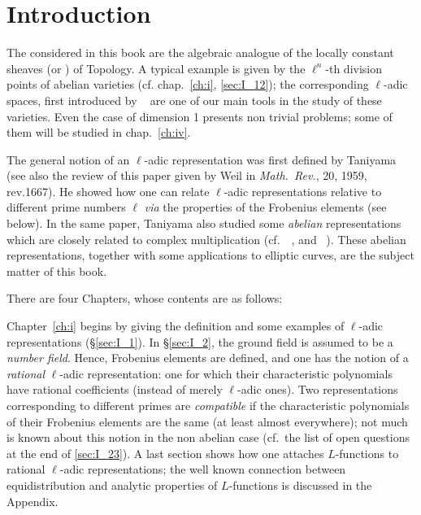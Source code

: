 \chapter*{Introduction}
The  considered in this book are the
algebraic analogue of the locally constant sheaves (or ) of Topology. A typical example is given by the $\ell^n$-th
division points of abelian varieties (cf. chap.~\ref{ch:i}, \ref{sec:I_12});
the corresponding $\ell$-adic spaces, first introduced by
\citeauthor{40}~\cite{40} are one of our main tools in the study of these
varieties. Even the case of dimension 1 presents non trivial problems; some of
them will be studied in chap.~\ref{ch:iv}.

The general notion of an $\ell$-adic representation was first defined by
Taniyama \cite{35} (see also the review of this paper given by Weil in
\emph{Math.\ Rev.}, 20, 1959, rev.1667).  He showed how one can relate
$\ell$-adic representations relative to different prime numbers $\ell$
\emph{via} the properties of the Frobenius elements (see below). In the same
paper, Taniyama also studied some \emph{abelian} representations which are
closely related to complex multiplication (cf.\ \citeauthor{41}~\cite{41},
\cite{42} and \citeauthor{34}~\cite{34}). These abelian representations,
together with some applications to elliptic curves, are the subject matter of
this book.

There are four Chapters, whose contents are as follows:

Chapter~\ref{ch:i} begins by giving the definition and some examples of
$\ell$-adic representations (\S\ref{sec:I_1}). In \S\ref{sec:I_2}, the ground
field is assumed to be a \emph{number field}. Hence, Frobenius elements are
defined, and one has the notion of a \emph{rational} $\ell$-adic
representation: one for which their characteristic polynomials have rational
coefficients (instead of merely $\ell$-adic ones). Two representations
corresponding to different primes are \emph{compatible} if the characteristic
polynomials of their Frobenius elements are the same (at least almost
everywhere); not much is known about this notion in the non abelian case (cf.\
the list of open questions at the end of \ref{sec:I_23}). A last section shows
how one attaches $L$-functions to rational $\ell$-adic representations; the
well known connection between equidistribution and analytic properties of
$L$-functions is discussed in the Appendix.

